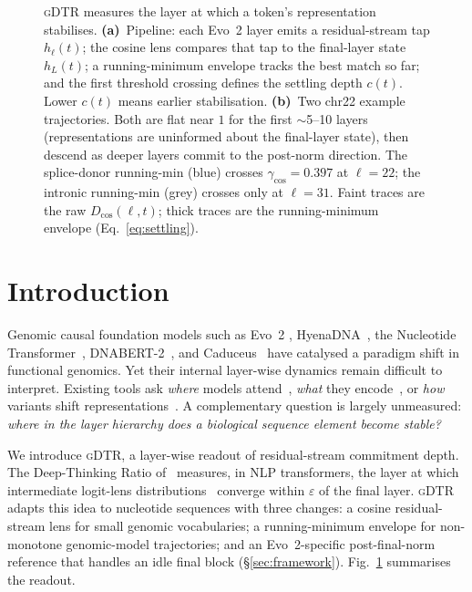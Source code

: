 \documentclass{article}
\theoremstyle{plain}
\theoremstyle{definition}
\theoremstyle{remark}
\newcommand{\gDTR}{\textsc{gDTR}}
\newcommand{\Dcos}{D_{\cos}}
\begin{document}
\begin{figure}[!t]
\centering
\resizebox{0.96\textwidth}{!}{}
\caption{\gDTR{} measures the layer at which a token's representation stabilises. \textbf{(a)}~Pipeline: each Evo~2 layer emits a residual-stream tap $h_\ell(t)$; the cosine lens compares that tap to the final-layer state $h_L(t)$; a running-minimum envelope tracks the best match so far; and the first threshold crossing defines the settling depth $c(t)$. Lower $c(t)$ means earlier stabilisation. \textbf{(b)}~Two chr22 example trajectories. Both are flat near $1$ for the first $\sim$5--10 layers (representations are uninformed about the final-layer state), then descend as deeper layers commit to the post-norm direction. The splice-donor running-min (blue) crosses $\gamma_{\cos}\!=\!0.397$ at $\ell\!=\!22$; the intronic running-min (grey) crosses only at $\ell\!=\!31$. Faint traces are the raw $\Dcos(\ell, t)$; thick traces are the running-minimum envelope (Eq.~\ref{eq:settling}).}
\label{fig:schematic}
\end{figure}

\section{Introduction}
\label{sec:intro}

Genomic causal foundation models such as Evo~2 \cite{nguyen2026evo2}, HyenaDNA~\cite{nguyen2023hyenadna}, the Nucleotide Transformer~\cite{dallatorre2024nt}, DNABERT-2~\cite{zhou2024dnabert2}, and Caduceus~\cite{schiff2024caduceus} have catalysed a paradigm shift in functional genomics. Yet their internal layer-wise dynamics remain difficult to interpret. Existing tools ask \emph{where} models attend~\cite{abnar2020rollout,avsec2021enformer}, \emph{what} they encode~\cite{bricken2023monosemanticity,cunningham2023sparse}, or \emph{how} variants shift representations~\cite{cheng2023alphamissense,jaganathan2019spliceai}. A complementary question is largely unmeasured: \emph{where in the layer hierarchy does a biological sequence element become stable?}

We introduce \gDTR{}, a layer-wise readout of residual-stream commitment depth. The Deep-Thinking Ratio of~\citet{chen2026deepthinking} measures, in NLP transformers, the layer at which intermediate logit-lens distributions~\cite{nostalgebraist2020logitlens,belrose2023tunedlens,pal2023futurelens} converge within $\varepsilon$ of the final layer. \gDTR{} adapts this idea to nucleotide sequences with three changes: a cosine residual-stream lens for small genomic vocabularies; a running-minimum envelope for non-monotone genomic-model trajectories; and an Evo~2-specific post-final-norm reference that handles an idle final block (\S\ref{sec:framework}). Fig.~\ref{fig:schematic} summarises the readout.
\end{document}
